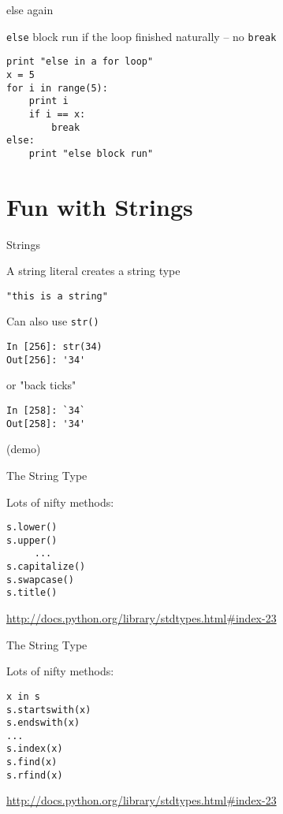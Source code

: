 \documentclass{beamer}
\begin{document}
\begin{frame}[fragile]{else again}

{\Large \verb|else| block run if the loop finished naturally -- no \verb|break|}

\begin{verbatim}
print "else in a for loop"
x = 5
for i in range(5):
    print i
    if i == x:
        break
else:
    print "else block run"

\end{verbatim}
\end{frame}

\section{Fun with Strings}

\begin{frame}[fragile]{Strings}

{\Large A string literal creates a string type}

\begin{verbatim}
"this is a string"
\end{verbatim}

{\Large Can also use \verb|str()|}

\begin{verbatim}
In [256]: str(34)
Out[256]: '34'
\end{verbatim}
{\Large or "back ticks"}
\begin{verbatim}
In [258]: `34`
Out[258]: '34'
\end{verbatim}
(demo)
\end{frame} 

\begin{frame}[fragile]{The String Type}

{\Large Lots of nifty methods:}

\begin{verbatim}
s.lower()
s.upper()
     ...
s.capitalize()
s.swapcase()
s.title()
\end{verbatim}

\url{http://docs.python.org/library/stdtypes.html#index-23}

\end{frame} 

\begin{frame}[fragile]{The String Type}

{\Large Lots of nifty methods:}

\begin{verbatim}
x in s
s.startswith(x)
s.endswith(x)
...
s.index(x)
s.find(x)
s.rfind(x)
\end{verbatim}

\url{http://docs.python.org/library/stdtypes.html#index-23}

\end{frame} 
\end{document}
